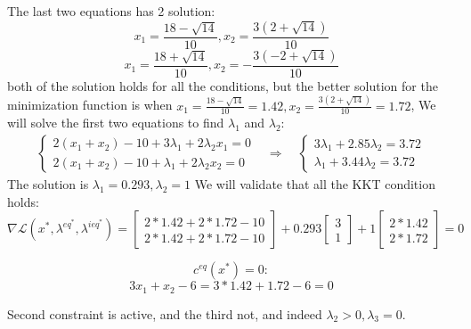 \documentclass{article}
\begin{document}
\begin{enumerate}[(a)]
The last two equations has 2 solution:
\[ x_1 = \frac{18-\sqrt{14}}{10},x_2 = \frac{3(2+\sqrt{14})}{10} \]
\[ x_1 = \frac{18+\sqrt{14}}{10},x_2 = -\frac{3(-2+\sqrt{14})}{10} \]
both of the solution holds for all the conditions, but the better solution for the minimization function is when $x_1 = \frac{18-\sqrt{14}}{10}=1.42,x_2 = \frac{3(2+\sqrt{14})}{10} = 1.72$, We will solve the first two equations to find $\lambda_1$ and $\lambda_2$:
\begin{align*}
\begin{cases}
2(x_1 + x_2) - 10 +3\lambda_1 + 2\lambda_2 x_1 = 0\\
2(x_1 + x_2) - 10 +\lambda_1 + 2\lambda_2 x_2 = 0
\end{cases}
&\Rightarrow \quad
\begin{cases}
3\lambda_1 + 2.85\lambda_2 = 3.72\\
\lambda_1 + 3.44\lambda_2 = 3.72
\end{cases}
\end{align*}
The solution is $\lambda_1=0.293,\lambda_2=1$
We will validate that all the KKT condition holds:
\[
\nabla \mathcal{L}(x^*, \lambda^{eq^{*}}, \lambda^{ieq^{*}}) =
\begin{bmatrix}
2*1.42 + 2*1.72 - 10 \\
2*1.42 + 2*1.72 - 10
\end{bmatrix}
+ 0.293
\begin{bmatrix}
3 \\
1
\end{bmatrix}
+ 1
\begin{bmatrix}
2*1.42 \\
2*1.72
\end{bmatrix}
= 0
\]

\[c^{eq}(x^*) = 0:\]
\[
3x_1 + x_2 - 6 = 3 * 1.42 + 1.72 - 6 = 0
\]

Second constraint is active, and the third not, and indeed $\lambda_2 > 0, \lambda_3 = 0.$


\end{enumerate}
\end{document}
